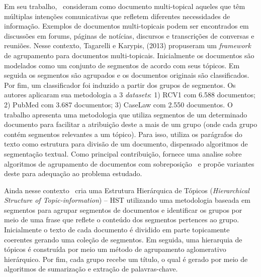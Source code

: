 Em seu trabalho,~\cite{Tagarelli2013} consideram como documento multi-topical aqueles que têm múltiplas intenções comunicativas que refletem diferentes necessidades de informação.
Exemplos de documentos multi-topicais podem ser encontrados em discussões em forums, páginas de notícias, discursos e transcrições de conversas e reuniões. Nesse contexto, Tagarelli e Karypis, (2013) propuseram um \textit{framework} de agrupamento para documentos multi-topicais. %
Inicialmente os documentos são modelados como um conjunto de segmentos de acordo com seus tópicos. Em seguida os segmentos são agrupados e os documentos originais são classificados. Por fim, um classificador foi induzido a partir dos grupos de segmentos.
Os autores aplicaram sua metodologia a 3 \textit{datasets}: 1) RCV1 com 6.588 documentos; 2) PubMed com 3.687 documentos; 3) CaseLaw com 2.550 documentos. 
O trabalho apresenta uma metodologia que utiliza segmentos de um determinado documento para facilitar a atribuição deste a mais de um grupo (onde cada grupo contém segmentos relevantes a um tópico). Para isso, utiliza os parágrafos do texto como estrutura para divisão de um documento, dispensado algoritmos de segmentação textual. Como principal contribuição, fornece uma analise sobre algoritmos de agrupamento de documentos com sobreposição~\cite{Zhao2004, Dhillon2001, Zhao2004a} e propõe variantes deste para adequação ao problema estudado. 



Ainda nesse contexto~\cite{Cuong2011} cria uma Estrutura Hierárquica de Tópicos (\textit{Hierarchical Structure of Topic-information}) -- HST utilizando uma metodologia baseada em segmentos para agrupar segmentos de documentos e identificar os grupos por meio de uma frase que reflete o conteúdo dos segmentos pertences ao grupo.
Inicialmente o texto de cada documento é dividido em parte topicamente coerentes gerando uma coleção de segmentos. Em seguida, uma hierarquia de tópicos é construída por meio um método de agrupamento aglomerativo hierárquico. Por fim, cada grupo recebe um título, o qual é gerado por meio de algoritmos de sumarização e extração de palavras-chave.







